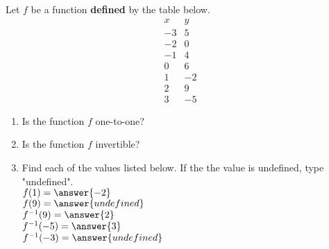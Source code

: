 \documentclass{ximera}
\author{Elizabeth Miller}
\begin{document}
Let $f$ be a function \textbf{defined} by the table below. 
$$
\begin{array}{cc}
x&y\\
\hline
-3&5\\
-2&0\\
-1&4\\
0&6\\
1&-2\\
2&9\\
3&-5
\end{array}
$$
\begin{exercise}

\begin{enumerate}
\item Is the function $f$ one-to-one?
\begin{multipleChoice}
\end{multipleChoice}

\item Is the function $f$ invertible?
\begin{multipleChoice}
\end{multipleChoice}

\item Find each of the values listed below.  If the the value is undefined, type "undefined". \\
$f(1) =\answer{-2}$ \\
$f(9)=\answer{undefined}$ \\
$f^{-1}(9)=\answer{2}$ \\
$f^{-1}(-5)=\answer{3}$ \\
$f^{-1}(-3)=\answer{undefined}$ \\
\end{enumerate}

\end{exercise}
\end{document}
